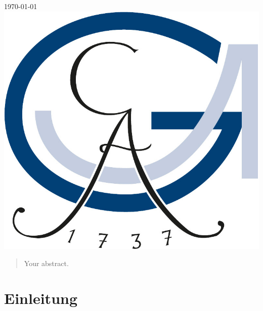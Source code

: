 \begin{titlepage}

{\large \today}\\[2cm] %


\includegraphics{logo_1.jpg}\\[1cm] %


\vfill %

\end{titlepage}


\begin{abstract}
Your abstract.
\end{abstract}

\section{Einleitung}


